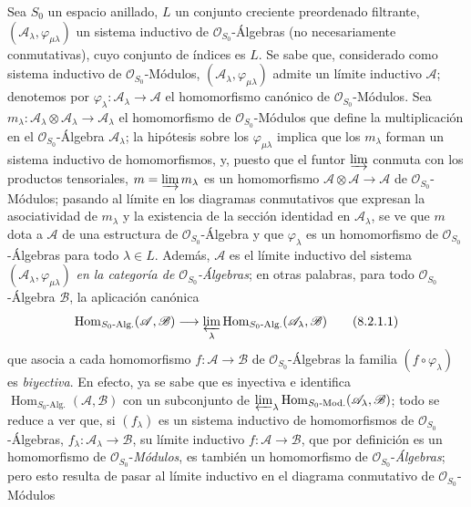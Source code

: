 \begin{env}[8.2.1]
\label{IV.8.2.1-fr}
Sea $S_0$ un espacio anillado, $L$ un conjunto creciente preordenado filtrante, $(\mathscr A_\lambda,\varphi_{\mu\lambda})$ un sistema inductivo de $\mathcal O_{S_0}$-Álgebras (no necesariamente conmutativas), cuyo conjunto de índices es $L$.
Se sabe que, considerado como sistema inductivo de $\mathcal O_{S_0}$-Módulos, $(\mathscr A_\lambda,\varphi_{\mu\lambda})$ admite un límite inductivo $\mathscr A$; denotemos por $\varphi_\lambda:\mathscr A_\lambda\to\mathscr A$ el homomorfismo canónico de $\mathcal O_{S_0}$-Módulos.
Sea $m_\lambda:\mathscr A_\lambda\otimes\mathscr A_\lambda\to\mathscr A_\lambda$ el homomorfismo de $\mathcal O_{S_0}$-Módulos que define la multiplicación en el $\mathcal O_{S_0}$-Álgebra $\mathscr A_\lambda$; la hipótesis sobre los $\varphi_{\mu\lambda}$ implica que los $m_\lambda$ forman un sistema inductivo de homomorfismos,
y, puesto que el funtor $\varinjlim$ conmuta con los productos tensoriales, $m=\varinjlim m_\lambda$ es un homomorfismo $\mathscr A\otimes\mathscr A\to\mathscr A$ de $\mathcal O_{S_0}$-Módulos; pasando al límite en los diagramas conmutativos que expresan la asociatividad de $m_\lambda$ y la existencia de la sección identidad en $\mathscr A_\lambda$, se ve que $m$ dota a $\mathscr A$ de una estructura de $\mathcal O_{S_0}$-Álgebra y que $\varphi_\lambda$ es un homomorfismo de $\mathcal O_{S_0}$-Álgebras para todo $\lambda\in L$.
Además, $\mathscr A$ es el límite inductivo del sistema $(\mathscr A_\lambda,\varphi_{\mu\lambda})$ \emph{en la categoría de $\mathcal O_{S_0}$-Álgebras}; en otras palabras, para todo $\mathcal O_{S_0}$-Álgebra $\mathscr B$, la aplicación canónica
\begin{equation}
\operatorname{Hom}_{S_0\text{-Alg.}}(\mathscr A,\mathscr B)
\longrightarrow
\varprojlim_\lambda
\operatorname{Hom}_{S_0\text{-Alg.}}
(\mathscr A_\lambda,\mathscr B)
\tag{8.2.1.1}\label{IV.8.2.1.1-fr}
\end{equation}
que asocia a cada homomorfismo $f:\mathscr A\to\mathscr B$ de $\mathcal O_{S_0}$-Álgebras la familia $(f\circ\varphi_\lambda)$ es \emph{biyectiva}.
En efecto, ya se sabe que es inyectiva e identifica $\operatorname{Hom}_{S_0\text{-Alg.}}(\mathscr A,\mathscr B)$ con un subconjunto de $\varprojlim_\lambda
\operatorname{Hom}_{S_0\text{-Mod.}}
(\mathscr A_\lambda,\mathscr B)$; todo se reduce a ver que, si $(f_\lambda)$ es un sistema inductivo de homomorfismos de $\mathcal O_{S_0}$-Álgebras, $f_\lambda:\mathscr A_\lambda\to\mathscr B$, su límite inductivo $f:\mathscr A\to\mathscr B$, que por definición es un homomorfismo de $\mathcal O_{S_0}$-\emph{Módulos}, es también un homomorfismo de $\mathcal O_{S_0}$-\emph{Álgebras}; pero esto resulta de pasar al límite inductivo en el diagrama conmutativo de $\mathcal O_{S_0}$-Módulos

\end{env}
